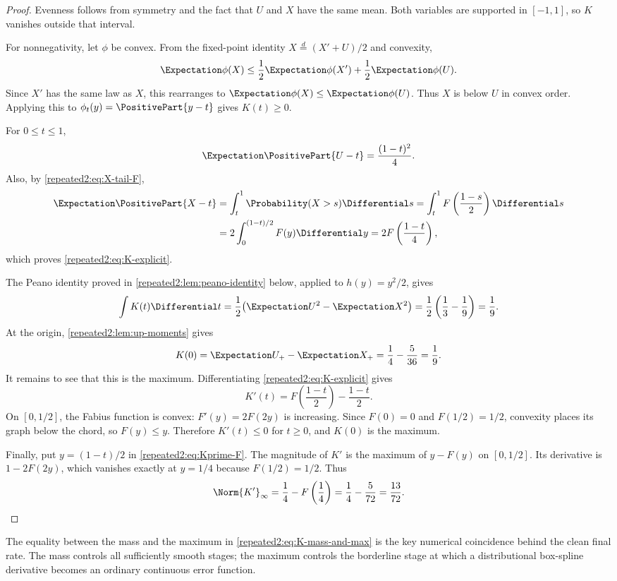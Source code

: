 \documentclass[11pt,oneside]{article}
\theoremstyle{definition}
\theoremstyle{remark}
\begin{document}
\begin{proof}
Evenness follows from symmetry and the fact that $U$ and $X$ have the same mean.  Both
variables are supported in $[-1,1]$, so $K$ vanishes outside that interval.

For nonnegativity, let $\phi$ be convex.  From the fixed-point identity
$X\stackrel d=(X'+U)/2$ and convexity,
\[
 \Expectation\phi(X)\le\frac12\Expectation\phi(X')+\frac12\Expectation\phi(U).
\]
Since $X'$ has the same law as $X$, this rearranges to
$\Expectation\phi(X)\le\Expectation\phi(U)$.  Thus $X$ is below $U$ in convex order.  Applying this to
$\phi_t(y)=\PositivePart{y-t}$ gives $K(t)\ge0$.

For $0\le t\le1$,
\[
 \Expectation\PositivePart{U-t}=\frac{(1-t)^2}{4}.
\]
Also, by \eqref{repeated2:eq:X-tail-F},
\begin{align*}
 \Expectation\PositivePart{X-t}
 &=\int_t^1\Probability(X>s)\Differential s
 =\int_t^1F\left(\frac{1-s}{2}\right)\Differential s\\
 &=2\int_0^{(1-t)/2}F(y)\Differential y
 =2F\left(\frac{1-t}{4}\right),
\end{align*}
which proves \eqref{repeated2:eq:K-explicit}.

The Peano identity proved in \cref{repeated2:lem:peano-identity} below, applied to
$h(y)=y^2/2$, gives
\[
 \int K(t)\Differential t=\frac12\bigl(\Expectation U^2-\Expectation X^2\bigr)
 =\frac12\left(\frac13-\frac19\right)=\frac19.
\]
At the origin, \cref{repeated2:lem:up-moments} gives
\[
 K(0)=\Expectation U_+-\Expectation X_+=\frac14-\frac5{36}=\frac19.
\]
It remains to see that this is the maximum.  Differentiating
\eqref{repeated2:eq:K-explicit} gives
\begin{equation}
 K'(t)=F\left(\frac{1-t}{2}\right)-\frac{1-t}{2}.
 \label{repeated2:eq:Kprime-F}
\end{equation}
On $[0,1/2]$, the Fabius function is convex: $F'(y)=2F(2y)$ is increasing.  Since
$F(0)=0$ and $F(1/2)=1/2$, convexity places its graph below the chord, so
$F(y)\le y$.  Therefore $K'(t)\le0$ for $t\ge0$, and $K(0)$ is the maximum.

Finally, put $y=(1-t)/2$ in \eqref{repeated2:eq:Kprime-F}.  The magnitude of $K'$ is the maximum of
$y-F(y)$ on $[0,1/2]$.  Its derivative is $1-2F(2y)$, which vanishes exactly at
$y=1/4$ because $F(1/2)=1/2$.  Thus
\[
 \Norm{K'}_\infty=\frac14-F\left(\frac14\right)
 =\frac14-\frac5{72}=\frac{13}{72}.
\]
\end{proof}

The equality between the mass and the maximum in \eqref{repeated2:eq:K-mass-and-max} is the key
numerical coincidence behind the clean final rate.  The mass controls all sufficiently
smooth stages; the maximum controls the borderline stage at which a distributional
box-spline derivative becomes an ordinary continuous error function.
\end{document}
